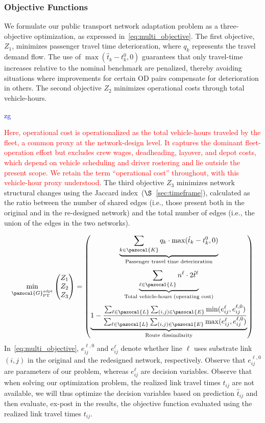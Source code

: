 \documentclass[a4paper,fleqn]{cas-sc}
\newcommand{\stkout}[1]{\ifmmode\text{\sout{\ensuremath{#1}}}\else\sout{#1}\fi}
\newcommand\rev[3]{\textcolor{blue}{\begin{scriptsize}{#1}\end{scriptsize}\stkout{#2}}\textcolor{red}{#3}}
\newcommand\rev[3]{\ignorespaces#3\ignorespaces\unskip}
\begin{document}
\subsubsection{Objective Functions}\label{sec:obj}
We formulate our public transport network adaptation problem as a three-objective optimization, as expressed in~\eqref{eq:multi_objective}. The first objective, $Z_1$, minimizes passenger travel time deterioration, where $q_k$ represents the travel demand flow. 
The use of $\max(\hat{t}_k - t_k^0, 0)$ guarantees that only travel-time increases relative to the nominal benchmark are penalized, thereby avoiding situations where improvements for certain OD pairs compensate for deterioration in others. 
%
The second objective $Z_2$ minimizes operational costs through total vehicle-hours.\rev{zg}{}{ Here, operational cost is operationalized as the total vehicle-hours traveled by the fleet, a common proxy at the network-design level. It captures the dominant fleet-operation effort but excludes crew wages, deadheading, layover, and depot costs, which depend on vehicle scheduling and driver rostering and lie outside the present scope. We retain the term ``operational cost'' throughout, with this vehicle-hour proxy understood.}
%
The third objective $Z_3$ minimizes network structural changes using the Jaccard index~($\S$~\ref{sec:timeframe}), calculated as the ratio between the number of shared edges (i.e., those present both in the original and in the re-designed network) and the total number of edges (i.e., the union of the edges in the two networks). 

\begin{equation}
\label{eq:multi_objective}
\min_{\pazocal{G}_{\text{PT}}^{\text{adpt}}} \begin{pmatrix} Z_1 \\ Z_2 \\ Z_3 \end{pmatrix} = \begin{pmatrix}
\underbrace{\sum_{k \in \pazocal{K}} q_k \cdot \max(\hat{t}_k - t_k^0, 0)}_{\text{Passenger travel time deterioration}} \\[8ex]
\underbrace{\sum_{\ell \in \pazocal{L}} n^\ell \cdot 2\hat{t}^\ell}_{\text{Total vehicle-hours (operating cost)}} \\[8ex]
\underbrace{1 - \frac{\sum_{\ell \in \pazocal{L}} \sum_{(i,j) \in \pazocal{E}} \min(e_{ij}^\ell, e_{ij}^{\ell, 0})}{\sum_{\ell \in \pazocal{L}} \sum_{(i,j) \in \pazocal{E}} \max(e_{ij}^\ell, e_{ij}^{\ell, 0})}}_{\text{Route dissimilarity}}
\end{pmatrix}
\end{equation}
In~\eqref{eq:multi_objective}, $e_{ij}^{\ell, 0}$ and $e_{ij}^\ell$ denote whether line $\ell$ uses substrate link $(i, j)$ in the original and the redesigned network, respectively. Observe that $e_{ij}^{\ell, 0}$ are parameters of our problem, whereas $e_{ij}^\ell$ are decision variables.
%
Observe that when solving our optimization problem, the realized link travel times $t_{ij}$ are not available, we will thus optimize the decision variables based on prediction $\hat{t}_{ij}$ and then evaluate, ex-post in the results, the objective function evaluated using the realized link travel times $t_{ij}$.
\end{document}
